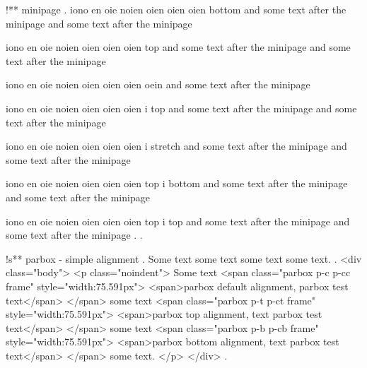 !** minipage
.
iono en oie noien oien oien oien bottom  and some text after the minipage and some text after the minipage

iono en oie noien oien oien oien top  and some text after the minipage and some text after the minipage


iono en oie noien oien oien oien oein  and some text after the minipage

iono en oie noien oien oien oien i top  and some text after the minipage and some text after the minipage

iono en oie noien oien oien oien i stretch  and some text after the minipage and some text after the minipage

iono en oie noien oien oien oien top i bottom  and some text after the minipage and some text after the minipage

iono en oie noien oien oien oien top i top  and some text after the minipage and some text after the minipage
.
.


!s** parbox - simple alignment
.
\noindent
Some text
some text
some text
some text.
.
<div class="body">
<p class="noindent">
Some text <span class="parbox p-c p-cc frame" style="width:75.591px">
<span>parbox default alignment, parbox test text</span>
</span>​ some text <span class="parbox p-t p-ct frame" style="width:75.591px">
<span>parbox top alignment, text parbox test text</span>
</span>​ some text <span class="parbox p-b p-cb frame" style="width:75.591px">
<span>parbox bottom alignment, text parbox test text</span>
</span>​ some text.
</p>
</div>
.


